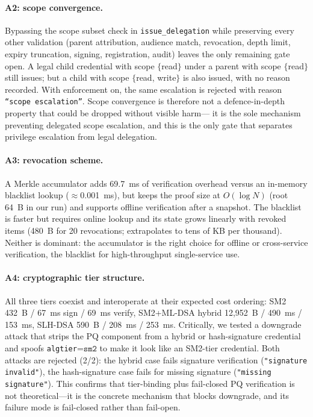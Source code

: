\documentclass[10pt,twocolumn]{IEEEtran}
\begin{document}
\paragraph{A2: scope convergence.} Bypassing the scope subset check in
\texttt{issue\_delegation} while preserving every other validation
(parent attribution, audience match, revocation, depth limit, expiry
truncation, signing, registration, audit) leaves the only remaining
gate open. A legal child credential with scope $\{$read$\}$ under a
parent with scope $\{$read$\}$ still issues; but a child with scope
$\{$read, write$\}$ is also issued, with no reason recorded. With
enforcement on, the same escalation is rejected with reason
\texttt{``scope escalation''}. Scope convergence is therefore not a
defence-in-depth property that could be dropped without visible harm---
it is the sole mechanism preventing delegated scope escalation, and
this is the only gate that separates privilege escalation from legal
delegation.

\paragraph{A3: revocation scheme.} A Merkle accumulator adds 69.7~ms
of verification overhead versus an in-memory blacklist lookup
($\approx$0.001~ms), but keeps the proof size at
$O(\log N)$ (root 64~B in our run) and supports offline verification
after a snapshot. The blacklist is faster but requires online lookup
and its state grows linearly with revoked items (480~B for 20
revocations; extrapolates to tens of KB per thousand). Neither is
dominant: the accumulator is the right choice for offline or
cross-service verification, the blacklist for high-throughput
single-service use.

\paragraph{A4: cryptographic tier structure.} All three tiers coexist
and interoperate at their expected cost ordering: SM2 432~B / 67~ms
sign / 69~ms verify, SM2+ML-DSA hybrid 12,952~B / 490~ms / 153~ms,
SLH-DSA 590~B / 208~ms / 253~ms. Critically, we tested a downgrade
attack that strips the PQ component from a hybrid or hash-signature
credential and spoofs \texttt{alg\textunderscore tier}=$\texttt{sm2}$
to make it look like an SM2-tier credential. Both attacks are
rejected (2/2): the hybrid case fails signature verification
(\texttt{"signature invalid"}), the hash-signature case fails for
missing signature (\texttt{"missing signature"}). This confirms that
tier-binding plus fail-closed PQ verification is not theoretical---it
is the concrete mechanism that blocks downgrade, and its failure
mode is fail-closed rather than fail-open.
\end{document}
